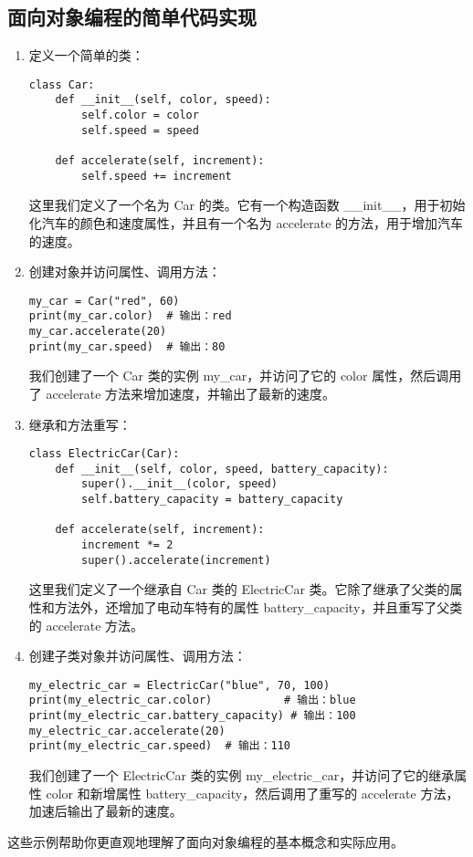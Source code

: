 \documentclass{article}
\begin{document}
\subsection{面向对象编程的简单代码实现}
\begin{enumerate}
 

\item 定义一个简单的类：
\begin{lstlisting}[caption={示例Python代码}]
class Car:
    def __init__(self, color, speed):
        self.color = color
        self.speed = speed
    
    def accelerate(self, increment):
        self.speed += increment
\end{lstlisting}
    

这里我们定义了一个名为 Car 的类。它有一个构造函数 \_\_init\_\_，用于初始化汽车的颜色和速度属性，并且有一个名为 accelerate 的方法，用于增加汽车的速度。

\item 创建对象并访问属性、调用方法：
\begin{lstlisting}[caption={示例Python代码}]
my_car = Car("red", 60)
print(my_car.color)  # 输出：red
my_car.accelerate(20)
print(my_car.speed)  # 输出：80
\end{lstlisting}
我们创建了一个 Car 类的实例 my\_car，并访问了它的 color 属性，然后调用了 accelerate 方法来增加速度，并输出了最新的速度。

\item 继承和方法重写：
\begin{lstlisting}[caption={示例Python代码}]
class ElectricCar(Car):
    def __init__(self, color, speed, battery_capacity):
        super().__init__(color, speed)
        self.battery_capacity = battery_capacity
    
    def accelerate(self, increment):
        increment *= 2  
        super().accelerate(increment)
\end{lstlisting}
这里我们定义了一个继承自 Car 类的 ElectricCar 类。它除了继承了父类的属性和方法外，还增加了电动车特有的属性 battery\_capacity，并且重写了父类的 accelerate 方法。

\item 创建子类对象并访问属性、调用方法：
\begin{lstlisting}[caption={示例Python代码}]
my_electric_car = ElectricCar("blue", 70, 100)
print(my_electric_car.color)           # 输出：blue
print(my_electric_car.battery_capacity) # 输出：100
my_electric_car.accelerate(20)
print(my_electric_car.speed)  # 输出：110
\end{lstlisting}
我们创建了一个 ElectricCar 类的实例 my\_electric\_car，并访问了它的继承属性 color 和新增属性 battery\_capacity，然后调用了重写的 accelerate 方法，加速后输出了最新的速度。
\end{enumerate}
这些示例帮助你更直观地理解了面向对象编程的基本概念和实际应用。
\end{document}
